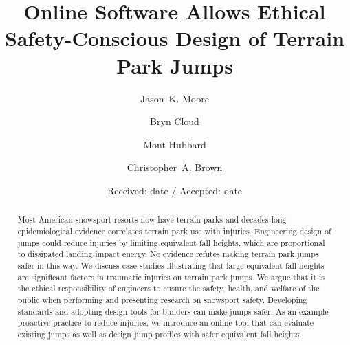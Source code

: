 \documentclass[smallextended]{svjour3}       %
\begin{document}
\title{Online Software Allows Ethical Safety-Conscious Design of Terrain Park Jumps}

\author{
  Jason~K. Moore \and
  Bryn Cloud \and
  Mont Hubbard \and
  Christopher~A. Brown
}


\date{Received: date / Accepted: date}

\maketitle

\begin{abstract}
  Most American snowsport resorts now have terrain parks and decades-long
  epidemiological evidence correlates terrain park use with injuries.
  Engineering design of jumps could reduce injuries by limiting equivalent fall
  heights, which are proportional to dissipated landing impact energy.  No
  evidence refutes making terrain park jumps safer in this way. We discuss case
  studies illustrating that large equivalent fall heights are significant
  factors in traumatic injuries on terrain park jumps. We argue that it is the
  ethical responsibility of engineers to ensure the safety, health, and welfare
  of the public when performing and presenting research on snowsport safety.
  Developing standards and adopting design tools for builders can make jumps
  safer. As an example proactive practice to reduce injuries, we introduce an
  online tool that can evaluate existing jumps as well as design jump profiles
  with safer equivalent fall heights.
\end{abstract}
\end{document}
